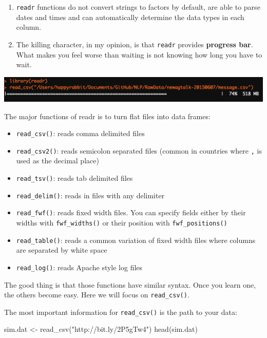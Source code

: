 \documentclass[
  12pt,
]{krantz}
\makeatletter
\newenvironment{Shaded}{\begin{snugshade}}{\end{snugshade}}
\newcommand{\FunctionTok}[1]{\textcolor[rgb]{0,0,0}{#1}}
\newcommand{\NormalTok}[1]{#1}
\newcommand{\OtherTok}[1]{\textcolor[rgb]{0.37,0.37,0.37}{#1}}
\newcommand{\StringTok}[1]{\textcolor[rgb]{0.5,0.5,0.5}{#1}}
\providecommand{\tightlist}{%
  \setlength{\itemsep}{0pt}\setlength{\parskip}{0pt}}
\newenvironment{kframe}{%
\medskip{}
\setlength{\fboxsep}{.8em}
 \def\at@end@of@kframe{}%
 \ifinner\ifhmode%
  \def\at@end@of@kframe{\end{minipage}}%
  \begin{minipage}{\columnwidth}%
 \fi\fi%
 \def\FrameCommand##1{\hskip\@totalleftmargin \hskip-\fboxsep
 \colorbox{shadecolor}{##1}\hskip-\fboxsep
     \hskip-\linewidth \hskip-\@totalleftmargin \hskip\columnwidth}%
 \MakeFramed {\advance\hsize-\width
   \@totalleftmargin\z@ \linewidth\hsize
   \@setminipage}}%
 {\par\unskip\endMakeFramed%
 \at@end@of@kframe}
\renewenvironment{Shaded}{\begin{kframe}}{\end{kframe}}
\makeatother
\begin{document}
\begin{enumerate}
\def\labelenumi{\arabic{enumi}.}
\item
  \texttt{readr} functions do not convert strings to factors by default, are able to parse dates and times and can automatically determine the data types in each column.
\item
  The killing character, in my opinion, is that \texttt{readr} provides \textbf{progress bar}. What makes you feel worse than waiting is not knowing how long you have to wait.
\end{enumerate}

\includegraphics{images/prograssbar.png}

The major functions of readr is to turn flat files into data frames:

\begin{itemize}
\tightlist
\item
  \texttt{read\_csv()}: reads comma delimited files
\item
  \texttt{read\_csv2()}: reads semicolon separated files (common in countries where \texttt{,} is used as the decimal place)
\item
  \texttt{read\_tsv()}: reads tab delimited files
\item
  \texttt{read\_delim()}: reads in files with any delimiter
\item
  \texttt{read\_fwf()}: reads fixed width files. You can specify fields either by their widths with \texttt{fwf\_widths()} or their position with \texttt{fwf\_positions()}\\
\item
  \texttt{read\_table()}: reads a common variation of fixed width files where columns are separated by white space
\item
  \texttt{read\_log()}: reads Apache style log files
\end{itemize}

The good thing is that those functions have similar syntax. Once you learn one, the others become easy. Here we will focus on \texttt{read\_csv()}.

The most important information for \texttt{read\_csv()} is the path to your data:

\begin{Shaded}
\begin{Highlighting}[]
\NormalTok{sim.dat }\OtherTok{\textless{}{-}} \FunctionTok{read\_csv}\NormalTok{(}\StringTok{"http://bit.ly/2P5gTw4"}\NormalTok{)}
\FunctionTok{head}\NormalTok{(sim.dat)}
\end{Highlighting}
\end{Shaded}
\end{document}
